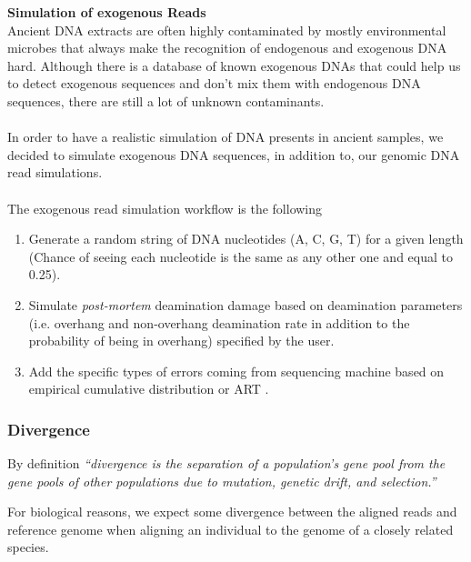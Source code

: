 \documentclass[11pt,a4paper]{report}
\newcommand{\quotes}[1]{``#1''}
\begin{document}
\textbf{Simulation of exogenous Reads }\\

Ancient DNA extracts are often highly contaminated by mostly environmental 
microbes that always make the recognition of endogenous and exogenous DNA 
hard. Although there is a database of known exogenous DNAs that could help 
us to detect exogenous sequences and don't mix them with endogenous DNA 
sequences, there are still a lot of unknown contaminants.
\\\\
In order to have a realistic simulation of DNA presents in ancient
samples, we decided to simulate exogenous DNA sequences, in addition to, our 
genomic DNA read simulations.
\\\\
The exogenous read simulation workflow is the following 

\begin{enumerate}

 \item Generate a random string of DNA nucleotides (A, C, G, T) 
 for a given length (Chance of seeing each nucleotide is the same as any
  other one and equal to 0.25).

\item Simulate \emph{post-mortem} deamination damage based on deamination
 parameters (i.e. overhang and non-overhang deamination rate in addition to 
 the probability of being in overhang) specified by the user. 

 \item Add the specific types of errors coming from sequencing machine 
 based on empirical cumulative distribution or ART\cite{art} .

\end{enumerate}





\subsubsection{Divergence} \label{Divergence}

By definition \emph{\quotes{divergence is the separation
of a population's gene pool from the gene pools of other populations 
due to mutation, genetic drift, and selection\cite{divergence1}.}}

For biological reasons, we expect some divergence between
the aligned reads and reference genome when aligning an individual 
to the genome of a closely related species.
\end{document}
